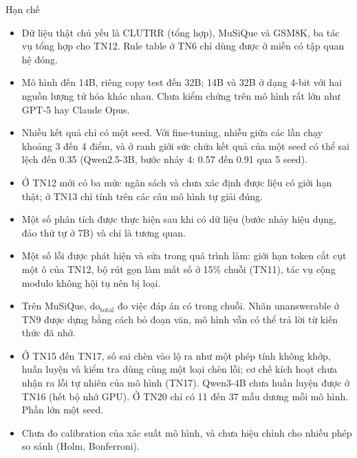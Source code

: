 \documentclass[aspectratio=169,t,10pt]{beamer}
\newcommand{\dt}{\mathrm{do}_{\text{total}}}
\begin{document}
\begin{frame}[shrink]{Hạn chế}
\begin{itemize}
  \setlength{\itemsep}{4pt}
  \item Dữ liệu thật chủ yếu là CLUTRR (tổng hợp), MuSiQue và GSM8K, ba tác vụ tổng hợp cho TN12. Rule table ở TN6 chỉ dùng được ở miền có tập quan hệ đóng.
  \item Mô hình đến 14B, riêng copy test đến 32B; 14B và 32B ở dạng 4-bit với hai nguồn lượng tử hóa khác nhau. Chưa kiểm chứng trên mô hình rất lớn như GPT-5 hay Claude Opus.
  \item Nhiều kết quả chỉ có một seed. Với fine-tuning, nhiễu giữa các lần chạy khoảng 3 đến 4 điểm, và ở ranh giới sức chứa kết quả của một seed có thể sai lệch đến 0.35 (Qwen2.5-3B, bước nhảy 4: 0.57 đến 0.91 qua 5 seed).
  \item Ở TN12 mới có ba mức ngân sách và chưa xác định được liệu có giới hạn thật; ở TN13 chỉ tính trên các câu mô hình tự giải đúng.
  \item Một số phân tích được thực hiện sau khi có dữ liệu (bước nhảy hiệu dụng, đảo thứ tự ở 7B) và chỉ là tương quan.
  \item Một số lỗi được phát hiện và sửa trong quá trình làm: giới hạn token cắt cụt một ô của TN12, bộ rút gọn làm mất số ở 15\% chuỗi (TN11), tác vụ cộng modulo không hội tụ nên bị loại.
  \item Trên MuSiQue, $\dt$ đo việc đáp án có trong chuỗi. Nhãn unanswerable ở TN9 được dựng bằng cách bỏ đoạn văn, mô hình vẫn có thể trả lời từ kiến thức đã nhớ.
  \item Ở TN15 đến TN17, số sai chèn vào lộ ra như một phép tính không khớp, huấn luyện và kiểm tra dùng cùng một loại chèn lỗi; cơ chế kích hoạt chưa nhận ra lỗi tự nhiên của mô hình (TN17). Qwen3-4B chưa huấn luyện được ở TN16 (hết bộ nhớ GPU). Ở TN20 chỉ có 11 đến 37 mẫu dương mỗi mô hình. Phần lớn một seed.
  \item Chưa đo calibration của xác suất mô hình, và chưa hiệu chỉnh cho nhiều phép so sánh (Holm, Bonferroni).
\end{itemize}
\end{frame}
\end{document}
